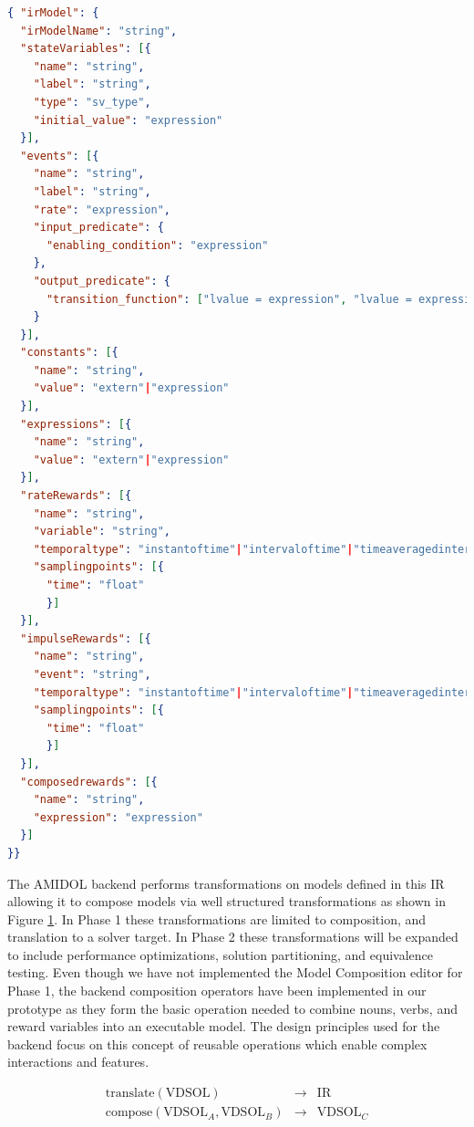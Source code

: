 \documentclass[11pt]{article}
\newcommand{\amidol}{\textsc{AMIDOL}}
\begin{document}
\begin{lstlisting}[language=json, caption=JSON Schema for the AMIDOL Intermediate Representation]
{ "irModel": {
  "irModelName": "string",
  "stateVariables": [{
    "name": "string",
    "label": "string",
    "type": "sv_type",
    "initial_value": "expression"
  }],
  "events": [{
    "name": "string",
    "label": "string",
    "rate": "expression",
    "input_predicate": {
      "enabling_condition": "expression"
    },
    "output_predicate": {
      "transition_function": ["lvalue = expression", "lvalue = expression", ...]
    }
  }],
  "constants": [{
    "name": "string",
    "value": "extern"|"expression"
  }],
  "expressions": [{
    "name": "string",
    "value": "extern"|"expression"
  }],
  "rateRewards": [{
    "name": "string",
    "variable": "string",
    "temporaltype": "instantoftime"|"intervaloftime"|"timeaveragedintervaloftime"|"steadystate",
    "samplingpoints": [{
      "time": "float"
      }]    
  }],
  "impulseRewards": [{
    "name": "string",
    "event": "string",
    "temporaltype": "instantoftime"|"intervaloftime"|"timeaveragedintervaloftime"|"steadystate",
    "samplingpoints": [{
      "time": "float"
      }]    
  }],
  "composedrewards": [{
    "name": "string",
    "expression": "expression"
  }]
}}
\end{lstlisting}

The \amidol{} backend performs transformations on models defined in this IR allowing it to compose models via well structured transformations as shown in Figure \ref{Fig:AMIDOLBackend}.  In Phase 1 these transformations are limited to composition, and translation to a solver target.  In Phase 2 these transformations will be expanded to include performance optimizations, solution partitioning, and equivalence testing.  Even though we have not implemented the Model Composition editor for Phase 1, the backend composition operators have been implemented in our prototype as they form the basic operation needed to combine nouns, verbs, and reward variables into an executable model.  The design principles used for the backend focus on this concept of reusable operations which enable complex interactions and features.

\begin{figure}
  \begin{eqnarray}
    \mathrm{translate}(\mathrm{VDSOL}) & \rightarrow & \mathrm{IR}\\
    \mathrm{compose}(\mathrm{VDSOL}_A, \mathrm{VDSOL}_B) & \rightarrow & \mathrm{VDSOL}_C\\
  \end{eqnarray}
  \caption{}
  \label{Fig:AMIDOLBackend}
\end{figure}
\end{document}
